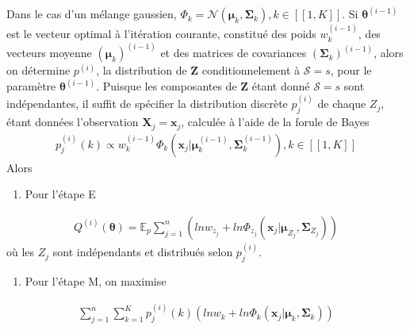 \documentclass[letterpaper,10pt,english]{jupyterBook}
\begin{document}
\sphinxAtStartPar
Dans le cas d’un mélange gaussien, \(\Phi_k=\mathcal N(\boldsymbol\mu_k,\boldsymbol\Sigma_k),k\in[\![1,K]\!]\). Si \(\boldsymbol\theta^{(i-1)}\) est le vecteur optimal à l’itération courante, constitué des poids \(w_k^{(i-1)}\), des vecteurs moyenne \((\boldsymbol\mu_k)^{(i-1)}\) et des matrices de covariances \((\boldsymbol\Sigma_k)^{(i-1)}\), alors on détermine \(p^{(i)}\), la distribution de \(\mathbf Z\) conditionnelement à \(\mathcal S=s\), pour le paramètre \(\boldsymbol\theta^{(i-1)}\). Puisque les composantes de \(\mathbf Z\) étant donné \(\mathcal S=s\) sont indépendantes, il suffit de spécifier la distribution discrète \(p_j^{(i)}\) de chaque \(Z_j\), étant données l’observation \(\mathbf X_j=\mathbf x_j\), calculée à l’aide de la forule de Bayes
\begin{equation*}
\begin{split}p_j^{(i)}(k)\propto w_k^{(i-1)}\Phi_k(\mathbf x_j|\boldsymbol\mu_k^{(i-1)},\boldsymbol\Sigma_k^{(i-1)}),k\in[\![1,K]\!]\end{split}
\end{equation*}
\sphinxAtStartPar
Alors
\begin{enumerate}
%
\item {} 
\sphinxAtStartPar
Pour l’étape E

\end{enumerate}
\begin{equation*}
\begin{split}Q^{(i)}(\boldsymbol\theta) = \mathbb{E}_p \displaystyle\sum_{j=1}^n \left (ln w_{z_j} + ln \Phi_{z_j}(\mathbf x_j|\boldsymbol\mu_{Z_j},\boldsymbol\Sigma_{Z_j}) \right )\end{split}
\end{equation*}
\sphinxAtStartPar
où les \(Z_j\) sont indépendants et distribués selon \(p_j^{(i)}\).
\begin{enumerate}
%
\setcounter{enumi}{1}
\item {} 
\sphinxAtStartPar
Pour l’étape M, on maximise

\end{enumerate}
\begin{equation*}
\begin{split} \displaystyle\sum_{j=1}^n\displaystyle\sum_{k=1}^K p_j^{(i)}(k)\left (ln w_k + ln \Phi_k(\mathbf x_j|\boldsymbol\mu_{k},\boldsymbol\Sigma_{k})\right )\end{split}
\end{equation*}
\end{document}
